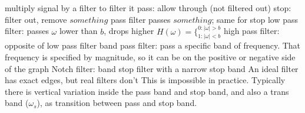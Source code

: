 \documentclass[12pt]{article}
\begin{document}
\begin{multicols*}{2}
\begin{flushleft}
\begin{outline}[longenum]
  \1 multiply signal by a filter to filter it
  \1 pass: allow through (not filtered out)
  \1 stop: filter out, remove
  \1 $something$ pass filter passes $something$; same for stop
  \1 low pass filter: passes $\omega$ lower than $b$, drops higher
    $H(\omega)=\{ _{1:|\omega|<b}^{0:|\omega|>b}$
  \1 high pass filter: opposite of low pass filter
  \1 band pass filter: pass a specific band of frequency.
    \2 That frequency is specified by magnitude, so it can be on the positive or negative side of the graph
  \1 Notch filter: band stop filter with a narrow stop band
  \1 An ideal filter has exact edges, but real filters don't
    \2 This is impossible in practice. 
      Typically there is vertical variation inside the pass band and stop band, and also a trans band ($\omega_s$), as transition between pass and stop band.

\end{outline}
\end{flushleft}
\end{multicols*}
\end{document}
